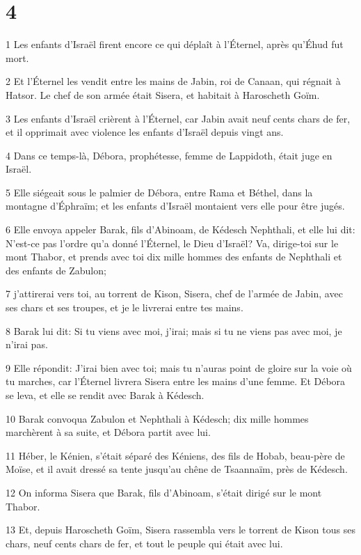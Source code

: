 \chapter{4}

\par 1 Les enfants d'Israël firent encore ce qui déplaît à l'Éternel, après qu'Éhud fut mort.
\par 2 Et l'Éternel les vendit entre les mains de Jabin, roi de Canaan, qui régnait à Hatsor. Le chef de son armée était Sisera, et habitait à Haroscheth Goïm.
\par 3 Les enfants d'Israël crièrent à l'Éternel, car Jabin avait neuf cents chars de fer, et il opprimait avec violence les enfants d'Israël depuis vingt ans.
\par 4 Dans ce temps-là, Débora, prophétesse, femme de Lappidoth, était juge en Israël.
\par 5 Elle siégeait sous le palmier de Débora, entre Rama et Béthel, dans la montagne d'Éphraïm; et les enfants d'Israël montaient vers elle pour être jugés.
\par 6 Elle envoya appeler Barak, fils d'Abinoam, de Kédesch Nephthali, et elle lui dit: N'est-ce pas l'ordre qu'a donné l'Éternel, le Dieu d'Israël? Va, dirige-toi sur le mont Thabor, et prends avec toi dix mille hommes des enfants de Nephthali et des enfants de Zabulon;
\par 7 j'attirerai vers toi, au torrent de Kison, Sisera, chef de l'armée de Jabin, avec ses chars et ses troupes, et je le livrerai entre tes mains.
\par 8 Barak lui dit: Si tu viens avec moi, j'irai; mais si tu ne viens pas avec moi, je n'irai pas.
\par 9 Elle répondit: J'irai bien avec toi; mais tu n'auras point de gloire sur la voie où tu marches, car l'Éternel livrera Sisera entre les mains d'une femme. Et Débora se leva, et elle se rendit avec Barak à Kédesch.
\par 10 Barak convoqua Zabulon et Nephthali à Kédesch; dix mille hommes marchèrent à sa suite, et Débora partit avec lui.
\par 11 Héber, le Kénien, s'était séparé des Kéniens, des fils de Hobab, beau-père de Moïse, et il avait dressé sa tente jusqu'au chêne de Tsaannaïm, près de Kédesch.
\par 12 On informa Sisera que Barak, fils d'Abinoam, s'était dirigé sur le mont Thabor.
\par 13 Et, depuis Haroscheth Goïm, Sisera rassembla vers le torrent de Kison tous ses chars, neuf cents chars de fer, et tout le peuple qui était avec lui.
